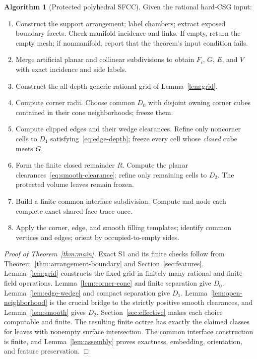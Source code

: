 \documentclass[11pt]{article}
\theoremstyle{definition}
\newtheorem{algorithm}[theorem]{Algorithm}
\theoremstyle{remark}
\begin{document}
\begin{algorithm}[Protected polyhedral SFCC]
\label{alg:protected}
Given the rational hard-CSG input:
\begin{enumerate}
\item Construct the support arrangement; label chambers; extract
  exposed boundary facets. Check manifold incidence and links.
  If empty, return the empty mesh; if nonmanifold, report that the
  theorem's input condition fails.
\item Merge artificial planar and collinear subdivisions to obtain
  $F_i$, $G$, $E$, and $V$ with exact incidence and side labels.
\item Construct the all-depth generic rational grid of
  Lemma~\ref{lem:grid}.
\item Compute corner radii. Choose common $D_0$ with disjoint owning
  corner cubes contained in their cone neighborhoods; freeze them.
\item Compute clipped edges and their wedge clearances. Refine only
  noncorner cells to $D_1$ satisfying~\eqref{eq:edge-depth}; freeze
  every cell whose \emph{closed} cube meets $G$.
\item Form the finite closed remainder $R$. Compute the planar
  clearances~\eqref{eq:smooth-clearance}; refine only remaining cells
  to $D_2$. The protected volume leaves remain frozen.
\item Build a finite common interface subdivision. Compute and node
  each complete exact shared face trace once.
\item Apply the corner, edge, and smooth filling templates; identify
  common vertices and edges; orient by occupied-to-empty sides.
\end{enumerate}
\end{algorithm}

\begin{proof}[Proof of Theorem~\ref{thm:main}]
Exact S1 and its finite checks follow from
Theorem~\ref{thm:arrangement-boundary} and
Section~\ref{sec:features}. Lemma~\ref{lem:grid} constructs the fixed
grid in finitely many rational and finite-field operations.
Lemma~\ref{lem:corner-cone} and finite separation give $D_0$.
Lemma~\ref{lem:edge-wedge} and compact separation give $D_1$.
Lemma~\ref{lem:open-neighborhood} is the crucial bridge to the
strictly positive smooth clearances, and Lemma~\ref{lem:smooth}
gives $D_2$. Section~\ref{sec:effective} makes each choice
computable and finite. The resulting finite octree has exactly the
claimed classes for leaves with nonempty surface intersection. The common interface
construction is finite, and Lemma~\ref{lem:assembly} proves exactness,
embedding, orientation, and feature preservation.
\end{proof}
\end{document}
